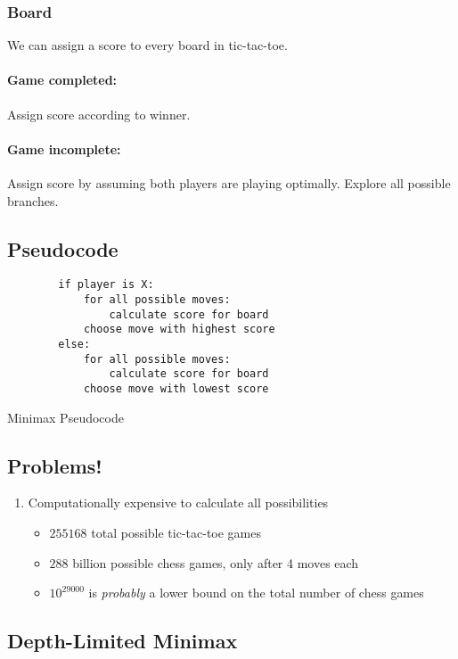 \subsubsection{Board}
We can assign a score to every board in tic-tac-toe.

\paragraph{Game completed:} Assign score according to winner.
\paragraph{Game incomplete:} Assign score by assuming both players are playing optimally.
Explore all possible branches.

\subsection{Pseudocode}
\begin{code}
	\begin{verbatim}
		if player is X:
			for all possible moves:
				calculate score for board
			choose move with highest score
		else:
			for all possible moves:
				calculate score for board
			choose move with lowest score
	\end{verbatim}
	\caption{Minimax Pseudocode}
\end{code}

\subsection{Problems!}
\begin{enumerate}
	\item Computationally expensive to calculate all possibilities
	      \begin{itemize}
		      \item $255168$ total possible tic-tac-toe games
		      \item $288$ billion possible chess games, only after 4 moves each
		      \item $10^{29000}$ is \emph{probably} a lower bound on the total number
		            of chess games
	      \end{itemize}
\end{enumerate}

\subsection{Depth-Limited Minimax}
